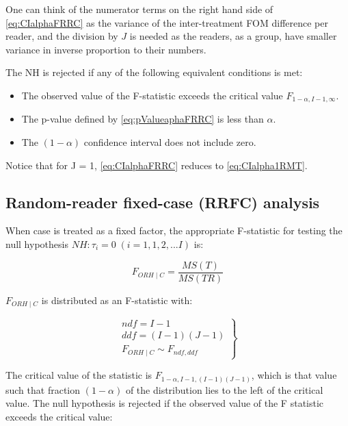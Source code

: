 \documentclass[
]{book}
\providecommand{\tightlist}{%
  \setlength{\itemsep}{0pt}\setlength{\parskip}{0pt}}
\begin{document}
One can think of the numerator terms on the right hand side of \eqref{eq:CIalphaFRRC} as the variance of the inter-treatment FOM difference per reader, and the division by \(J\) is needed as the readers, as a group, have smaller variance in inverse proportion to their numbers.

The NH is rejected if any of the following equivalent conditions is met:

\begin{itemize}
\tightlist
\item
  The observed value of the F-statistic exceeds the critical value \(F_{1-\alpha,I-1,\infty}\).
\item
  The p-value defined by \eqref{eq:pValueaphaFRRC} is less than \(\alpha\).
\item
  The \((1-\alpha)\) confidence interval does not include zero.
\end{itemize}

Notice that for J = 1, \eqref{eq:CIalphaFRRC} reduces to \eqref{eq:CIalpha1RMT}.

\hypertarget{random-reader-fixed-case-rrfc-analysis}{%
\subsection{Random-reader fixed-case (RRFC) analysis}\label{random-reader-fixed-case-rrfc-analysis}}

When case is treated as a fixed factor, the appropriate F-statistic for testing the null hypothesis \(NH: \tau_i = 0 \; (i=1,1,2,...I)\) is:

\begin{equation}
F_{ORH \mid C}=\frac{MS(T)}{MS(TR)}
\label{eq:DefFStatRRFC}
\end{equation}

\(F_{ORH \mid C}\) is distributed as an F-statistic with:

\begin{equation}
\left.\begin{matrix}
ndf=I-1\\ 
ddf=(I-1)(J-1)\\
F_{ORH \mid C} \sim F_{ndf,ddf}
\end{matrix}\right\}
\label{eq:FStatRRFC}
\end{equation}

The critical value of the statistic is \(F_{1-\alpha,I-1,(I-1)(J-1)}\), which is that value such that fraction \((1-\alpha)\) of the distribution lies to the left of the critical value. The null hypothesis is rejected if the observed value of the F statistic exceeds the critical value:
\end{document}
